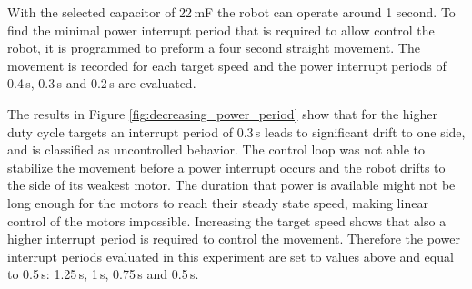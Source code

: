 With the selected capacitor of 22\,mF the robot can operate around 1 second. 
To find the minimal power interrupt period that is required to allow control the robot, it is programmed to preform a four second straight movement.
The movement is recorded for each target speed and the power interrupt periods of 0.4\,s, 0.3\,s and 0.2\,s are evaluated.

The results in Figure \ref{fig:decreasing_power_period} show that for the higher duty cycle targets an interrupt period of 0.3\,s leads to significant drift to one side, and is classified as uncontrolled behavior.
The control loop was not able to stabilize the movement before a power interrupt occurs and the robot drifts to the side of its weakest motor.
The duration that power is available might not be long enough for the motors to reach their steady state speed, making linear control of the motors impossible.
Increasing the target speed shows that also a higher interrupt period is required to control the movement. 
Therefore the power interrupt periods evaluated in this experiment are set to values above and equal to 0.5\,s: 1.25\,s, 1\,s, 0.75\,s and 0.5\,s.


